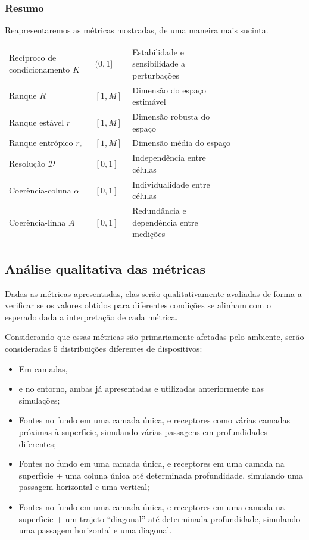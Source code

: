 \subsubsection*{Resumo}

Reapresentaremos as métricas mostradas, de uma maneira mais sucinta.

\begin{tabular}{p{0.32\linewidth} | p{0.05\linewidth} | p{0.4\linewidth}}
	Recíproco de condicionamento $K$ & $(0, 1]$ & Estabilidade e sensibilidade a perturbações \\
	Ranque $R$ & $[1, M]$ & Dimensão do espaço estimável \\
	Ranque estável $r$ & $[1, M]$ & Dimensão robusta do espaço \\
	Ranque entrópico $r_e$ & $[1, M]$ & Dimensão média do espaço \\
	Resolução $\mathcal{D}$ & $[0, 1]$ & Independência entre células \\
	Coerência-coluna $\alpha$ & $[0, 1]$ & Individualidade entre células \\
	Coerência-linha $A$ & $[0, 1]$ & Redundância e dependência entre medições
\end{tabular}

%

\subsection{Análise qualitativa das métricas}

Dadas as métricas apresentadas, elas serão qualitativamente avaliadas de forma a verificar se os valores obtidos para diferentes condições se alinham com o esperado dada a interpretação de cada métrica.

Considerando que essas métricas são primariamente afetadas pelo ambiente, serão consideradas 5 distribuições diferentes de dispositivos:
\begin{itemize}
	\item Em camadas,
	\item e no entorno, ambas já apresentadas e utilizadas anteriormente nas simulações;
	\item Fontes no fundo em uma camada única, e receptores como várias camadas próximas à superfície, simulando várias passagens em profundidades diferentes;
	\item Fontes no fundo em uma camada única, e receptores em uma camada na superfície + uma coluna única até determinada profundidade, simulando uma passagem horizontal e uma vertical;
	\item Fontes no fundo em uma camada única, e receptores em uma camada na superfície + um trajeto ``diagonal'' até determinada profundidade, simulando uma passagem horizontal e uma diagonal.
\end{itemize}

